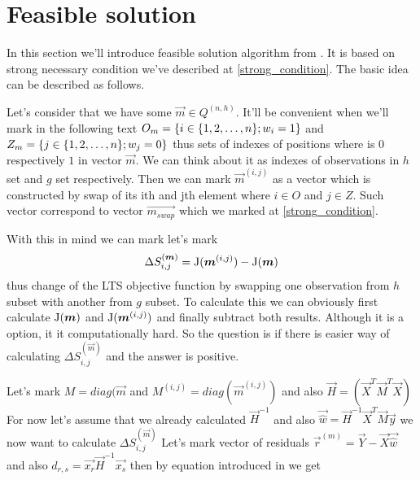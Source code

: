 


\section{Feasible solution} \label{section_feasible_solution}
In this section we'll introduce feasible solution algorithm from \cite{hawkins:1994}.
It is based on strong necessary condition we've described at \ref{strong_condition}. 
The basic idea can be described as follows.

Let's consider that we have some $\vec{m} \in Q^{(n,h)}$. It'll be convenient when we'll mark in the following text $O_m = \{{i \in  \{{  1,2,\ldots , n  \}} ;w_i = 1\}}$ and $Z_m = \{{j \in  \{{  1,2,\ldots , n  \}} ;w_j = 0\}}$ thus sets of indexes of positions where is $0$ respectively $1$ in vector $\vec{m}$. We can think about it as indexes of observations in $h$ set and $g$ set respectively. Then we can mark $\vec{m}^{(i,j)}$ as a vector which is constructed by swap of its ith and jth element where $i \in O$ and $j \in Z$. Such vector correspond to vector $\vec{m_{swap}}$ which we marked at \ref{strong_condition}.

With this in mind we can mark let's mark 
\begin{equation}
	\Delta S^{(\boldsymbol{m})}_{i,j} = \operatorname{J}(\boldsymbol{m}^{(i,j)}) - \operatorname{J}(\boldsymbol{m})
\end{equation}
thus change of the LTS objective function by swapping one observation from $h$ subset with another from $g$ subset. To calculate this we can obviously first calculate  $\operatorname{J}(\boldsymbol{m})$ and $ \operatorname{J}(\boldsymbol{m}^{(i,j)})$ and finally subtract both results. Although it is a option, it it computationally hard. So the question is if there is easier way of calculating $\Delta S^{(\vec{m})}_{i,j}$ and the answer is positive. 

Let's mark  
$M = diag(\vec{m}$ and 
$M^(i,j) = diag(\vec{m}^{(i,j)})$ and also
$\vec{H} = (\vec{X}^T\vec{M}^T\vec{X})$
For now let's assume that we already calculated
$\vec{H}^{-1}$ and also $\vec{\hat{w}} = \vec{H}^{-1}\vec{X}^T\vec{M}\vec{y}$
we now want to calculate $\Delta S^{(\vec{m})}_{i,j}$
Let's mark vector of residuals 
$\vec{r}^{(m)} = \vec{Y} - \vec{X} \vec{\hat{w}} $
and also $d_{r,s} = \vec{x_r} \vec{H}^{-1}  \vec{x_s} $
then by equation introduced in \cite{atkinson1991simulated} we get

